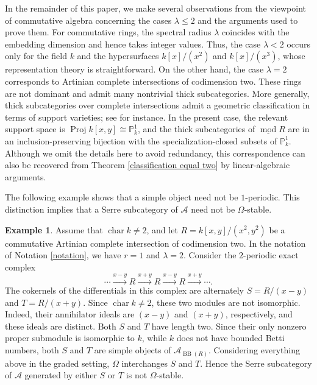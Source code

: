 \documentclass{amsart}
\theoremstyle{definition}
\newtheorem{eg}[thm]{Example}
\theoremstyle{remark}
\numberwithin{equation}{thm}
\def\A{\mathcal{A}}
\def\BB{\operatorname{BB}}
\def\le{\leqslant}
\begin{document}
In the remainder of this paper, we make several observations from the viewpoint of commutative algebra concerning the cases $\lambda\le 2$ and the arguments used to prove them.
For commutative rings, the spectral radius $\lambda$ coincides with the embedding dimension and hence takes integer values. Thus, the case $\lambda<2$ occurs only for the field $k$ and the hypersurfaces $k[x]/(x^2)$ and $k[x]/(x^3)$, whose representation theory is straightforward. On the other hand, the case $\lambda=2$ corresponds to Artinian complete intersections of codimension two. These rings are not dominant and admit many nontrivial thick subcategories.
More generally, thick subcategories over complete intersections admit a geometric classification in terms of support varieties; see \cite{CI, KS, S} for instance. In the present case, the relevant support space is $\operatorname{Proj} k[x,y]\cong \mathbb{P}^1_k$, and the thick subcategories of $\underline{\operatorname{mod}}R$ are in an inclusion-preserving bijection with the specialization-closed subsets of $\mathbb{P}^1_k$.
Although we omit the details here to avoid redundancy, this correspondence can also be recovered from Theorem \ref{classification equal two} by linear-algebraic arguments.

The following example shows that a simple object need not be $1$-periodic. This distinction implies that a Serre subcategory of $\A$ need not be $\Omega$-stable.

\begin{eg}
Assume that $\operatorname{char}k\ne2$, and let $R=k[x,y]/(x^2,y^2)$ be a commutative Artinian complete intersection of codimension two. 
In the notation of Notation \ref{notation}, we have $r=1$ and $\lambda=2$.
Consider the $2$-periodic exact complex
$$
\cdots \xrightarrow{x-y} R \xrightarrow{x+y} R \xrightarrow{x-y} R \xrightarrow{x+y} \cdots.
$$
The cokernels of the differentials in this complex are alternately $S=R/(x-y)$ and $T=R/(x+y)$.
Since $\operatorname{char}k\ne2$, these two modules are not isomorphic. Indeed, their annihilator ideals are $(x-y)$ and $(x+y)$, respectively, and these ideals are distinct. Both $S$ and $T$ have length two. Since their only nonzero proper submodule is isomorphic to $k$, while $k$ does not have bounded Betti numbers, both $S$ and $T$ are simple objects of $\A_{\BB(R)}$.
Considering everything above in the graded setting, $\Omega$ interchanges $S$ and $T$. Hence the Serre subcategory of $\A$ generated by either $S$ or $T$ is not $\Omega$-stable.
\end{eg}
\end{document}
